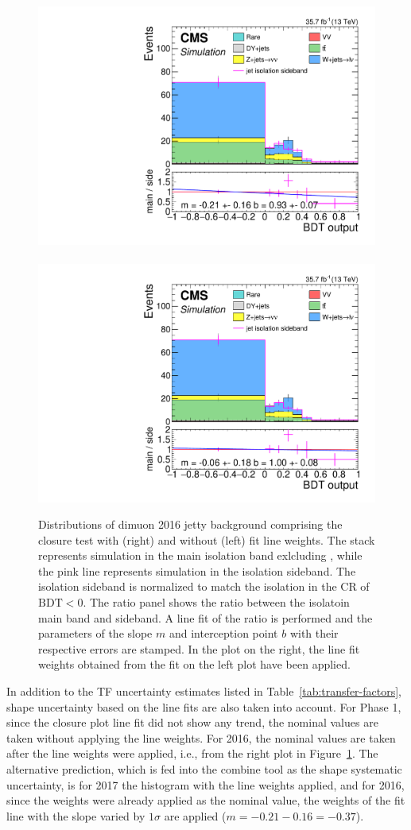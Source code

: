 \begin{figure}[!htb]
\centering
\includegraphics[width=0.48\linewidth]{plots/dilepton_muons_bg_isocr_no_retag_CorrJetNoMultIso10_06_2016_no_norm_sf/none_closure_dilepBDTphase1CorrJetNoMultIso10Dr0.6.pdf} \,
\includegraphics[width=0.48\linewidth]{plots/dilepton_muons_bg_isocr_no_retag_CorrJetNoMultIso10_06_2016_no_norm_sf_line_fit_line_weights/none_closure_dilepBDTphase1CorrJetNoMultIso10Dr0.6.pdf} 
 \\

\caption[Dimuon 2016 jetty background closure plots with and without fit line weights]{Distributions of dimuon 2016 jetty background comprising the closure test with (right) and without (left) fit line weights. The stack represents simulation in the main isolation band exlcluding \ztautau, while the pink line represents simulation in the isolation sideband. The isolation sideband is normalized to match the isolation in the CR of $\mathrm{BDT} < 0$. The ratio panel shows the ratio between the isolatoin main band and sideband. A line fit of the ratio is performed and the parameters of the slope $m$ and interception point $b$ with their respective errors are stamped. In the plot on the right, the line fit weights obtained from the fit on the left plot have been applied.}
\label{fig:dimuon-bdt-jetty-2016-closure}
\end{figure}

In addition to the TF uncertainty estimates listed in Table~\ref{tab:transfer-factors}, shape uncertainty based on the line fits are also taken into account. For Phase 1, since the closure plot line fit did not show any trend, the nominal values are taken without applying the line weights. For 2016, the nominal values are taken after the line weights were applied, i.e., from the right plot in Figure~\ref{fig:dimuon-bdt-jetty-2016-closure}. The alternative prediction, which is fed into the combine tool as the shape systematic uncertainty, is for 2017 the histogram with the line weights applied, and for 2016, since the weights were already applied as the nominal value, the weights of the fit line with the slope varied by $1\sigma$ are applied ($m= -0.21 - 0.16= -0.37$).


